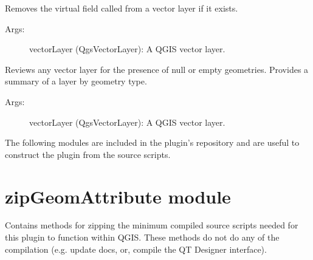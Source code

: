 \documentclass[letterpaper,10pt,english]{sphinxmanual}
\begin{document}
\begin{fulllineitems}
\label{\detokenize{API:parseQGISGeometry.layerRemoveVirtualGeometryField}}
Removes the virtual field called  from a vector layer if it exists.
\begin{description}
\item[{Args:}] \leavevmode
vectorLayer (QgsVectorLayer):  A QGIS vector layer.

\end{description}

\end{fulllineitems}


\begin{fulllineitems}
\label{\detokenize{API:parseQGISGeometry.layer_review}}

Reviews any vector layer for the presence of null or empty geometries.  Provides a summary of a layer by geometry
type.
\begin{description}
\item[{Args:}] \leavevmode
vectorLayer (QgsVectorLayer):  A QGIS vector layer.

\end{description}

\end{fulllineitems}


The following modules are included in the plugin’s repository and are useful to construct the plugin from the source
scripts.


\section{zipGeomAttribute module}
\label{\detokenize{API:module-zipGeomAttribute}}\label{\detokenize{API:zipgeomattribute-module}}
Contains methods for zipping the minimum compiled source scripts needed for this plugin to function within QGIS.  These
methods do not do any of the compilation (e.g. update docs, or, compile the QT Designer interface).
\end{document}
